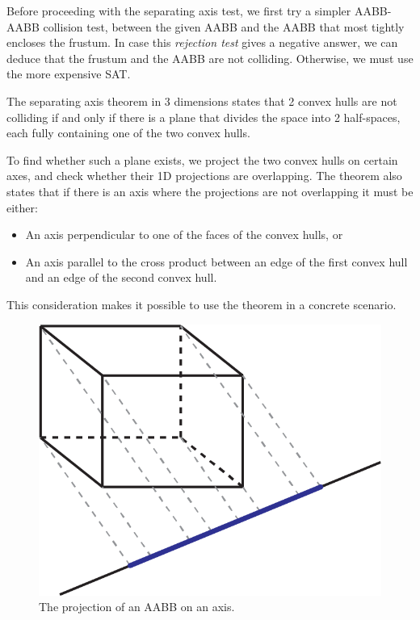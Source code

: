 \documentclass{PoliMi_MasterThesis}
\begin{document}
Before proceeding with the separating axis test, we first try a simpler AABB-AABB collision test, between the given AABB and the AABB that most tightly encloses the frustum. In case this \textit{rejection test} gives a negative answer, we can deduce that the frustum and the AABB are not colliding. Otherwise, we must use the more expensive SAT.

The separating axis theorem in 3 dimensions states that 2 convex hulls are not colliding if and only if there is a plane that divides the space into 2 half-spaces, each fully containing one of the two convex hulls.

To find whether such a plane exists, we project the two convex hulls on certain axes, and check whether their 1D projections are overlapping. The theorem also states that if there is an axis where the projections are not overlapping it must be either:
\begin{itemize}
	\item An axis perpendicular to one of the faces of the convex hulls, or
	\item An axis parallel to the cross product between an edge of the first convex hull and an edge of the second convex hull.
\end{itemize}
This consideration makes it possible to use the theorem in a concrete scenario.

\begin{figure}[H]
    \centering
    \includegraphics[width=\textwidth*\real{0.45}]{Images/aabb_1d_proj.png} 
    \caption{The projection of an AABB on an axis.}
    \label{fig:aabb_1d_proj}
\end{figure}
\end{document}
